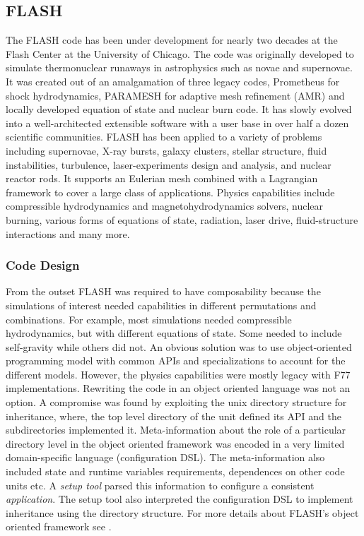 \subsection{FLASH}
The FLASH code \cite{FLASH,Dubey2009}  has been under development for nearly two decades at the
Flash Center at the University of Chicago. The code was originally
developed to simulate thermonuclear runaways in astrophysics such as
novae and supernovae. It was created out of an amalgamation of three
legacy codes, Prometheus for 
shock hydrodynamics, PARAMESH for adaptive mesh refinement (AMR) and
locally developed equation of state and nuclear burn code. It has
slowly evolved into a well-architected extensible software with a user
base in over half a dozen scientific communities. FLASH has been
applied to a variety of problems including supernovae, X-ray bursts,
galaxy clusters, stellar structure, fluid instabilities,
turbulence, laser-experiments design and analysis, and nuclear reactor
rods. It supports an Eulerian mesh combined with a Lagrangian
framework to cover a large class of applications. Physics capabilities
include compressible hydrodynamics and magnetohydrodynamics solvers,
nuclear burning, various forms of equations of state, radiation, laser
drive, fluid-structure interactions and many more.   

\subsubsection{Code Design}
\label{sec:FLASHdesign}

From the outset FLASH was required to have composability because the
simulations of interest needed capabilities in different permutations
and combinations. For example, most simulations needed compressible
hydrodynamics, but with different equations of state. Some needed to
include self-gravity while others did not. An 
obvious solution was to use object-oriented programming model with
common APIs and specializations to account for the different
models. However, the physics capabilities were mostly legacy with F77
implementations. Rewriting the code in an object oriented language was
not an option. A compromise was found by exploiting the unix directory
structure for inheritance, where, the top level directory of the unit
defined its API and the subdirectories implemented it.
Meta-information about the role of a particular directory level in the
object oriented framework was encoded in a very limited
domain-specific language (configuration DSL). The meta-information
also included state and runtime variables requirements, dependences on
other code units etc. A {\em setup tool} parsed this information to
configure a consistent {\em application}. The setup tool also
interpreted the configuration DSL to implement  inheritance using the
directory structure. For more details about FLASH's object oriented
framework see \cite{Dubey2009}.    

